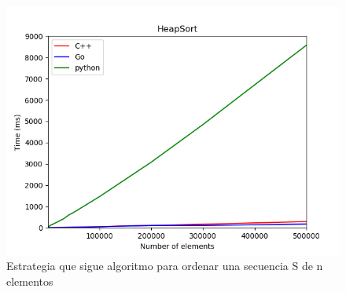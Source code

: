 \documentclass{article}
\begin{document}
            \begin{figure}[h!]
            \centering
            \includegraphics[width=12cm]{img/HeapSort_1.png}
            \caption{Estrategia que sigue algoritmo para ordenar una secuencia S de n elementos}
            \label{fig:heapsort}
        \end {figure}
\end{document}
